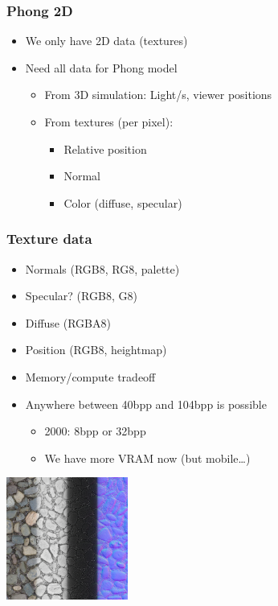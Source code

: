 \documentclass{beamer}
\begin{document}
\begin{frame}\frametitle{Phong 2D}

\begin{itemize}
\item
  We only have 2D data (textures)
\item
  Need all data for Phong model

  \begin{itemize}
  \item
    From 3D simulation: Light/s, viewer positions
  \item
    From textures (per pixel):

    \begin{itemize}
    \item
      Relative position
    \item
      Normal
    \item
      Color (diffuse, specular)
    \end{itemize}
  \end{itemize}
\end{itemize}

\end{frame}

\begin{frame}\frametitle{Texture data}

\begin{itemize}
\item
  Normals (RGB8, RG8, palette)
\item
  Specular? (RGB8, G8)
\item
  Diffuse (RGBA8)
\item
  Position (RGB8, heightmap)
\item
  Memory/compute tradeoff
\item
  Anywhere between 40bpp and 104bpp is possible

  \begin{itemize}
  \item
    2000: 8bpp or 32bpp
  \item
    We have more VRAM now (but mobile\ldots{})
  \end{itemize}
\end{itemize}
\begin{center}
\includegraphics[width=0.3\textwidth]{maps.jpg}
\end{center}

\end{frame}
\end{document}

